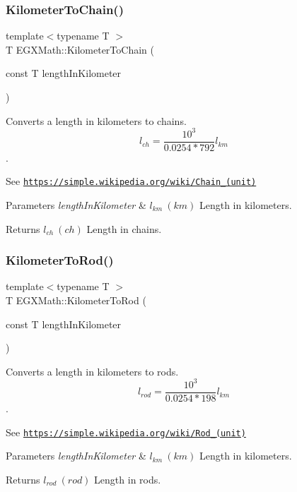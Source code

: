 \subsubsection{\texorpdfstring{Kilometer\+To\+Chain()}{KilometerToChain()}}
{\footnotesize\ttfamily template$<$typename T $>$ \\
T E\+G\+X\+Math\+::\+Kilometer\+To\+Chain (\begin{DoxyParamCaption}\item[{const T}]{length\+In\+Kilometer }\end{DoxyParamCaption})}



Converts a length in kilometers to chains. \[ l_{ch}= \frac{10^{3}}{0.0254 * 792} l_{km} \]. 

See \href{https://simple.wikipedia.org/wiki/Chain_(unit)}{\tt https\+://simple.\+wikipedia.\+org/wiki/\+Chain\+\_\+(unit)} 
\begin{DoxyParams}{Parameters}
{\em length\+In\+Kilometer} & $ l_{km}\ (km)$ Length in kilometers. \\
\hline
\end{DoxyParams}
\begin{DoxyReturn}{Returns}
$ l_{ch}\ (ch)$ Length in chains. 
\end{DoxyReturn}
\mbox{\label{group___e_g_x_math-_conversions-_length_conversions-_s_i-_kilometer-_surveyors_gae57f6033d241f64aa645a42bfe354567}} 
\subsubsection{\texorpdfstring{Kilometer\+To\+Rod()}{KilometerToRod()}}
{\footnotesize\ttfamily template$<$typename T $>$ \\
T E\+G\+X\+Math\+::\+Kilometer\+To\+Rod (\begin{DoxyParamCaption}\item[{const T}]{length\+In\+Kilometer }\end{DoxyParamCaption})}



Converts a length in kilometers to rods. \[ l_{rod}= \frac{10^{3}}{0.0254 * 198} l_{km} \]. 

See \href{https://simple.wikipedia.org/wiki/Rod_(unit)}{\tt https\+://simple.\+wikipedia.\+org/wiki/\+Rod\+\_\+(unit)} 
\begin{DoxyParams}{Parameters}
{\em length\+In\+Kilometer} & $ l_{km}\ (km)$ Length in kilometers. \\
\hline
\end{DoxyParams}
\begin{DoxyReturn}{Returns}
$ l_{rod}\ (rod)$ Length in rods. 
\end{DoxyReturn}
